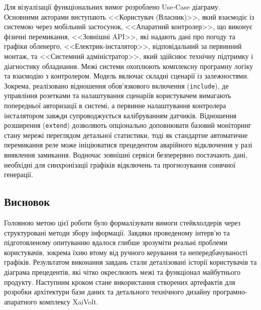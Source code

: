 \documentclass[14pt, a4paper]{extreport}
\begin{document}
	Для візуалізації функціональних вимог розроблено Use-Case діаграму. Основними акторами виступають <<Користувач (Власник)>>, який взаємодіє із системою через мобільний застосунок, <<Апаратний контролер>>, що виконує фізичні перемикання, <<Зовнішні API>>, які надають дані про погоду та графіки обленерго, <<Електрик-інсталятор>>, відповідальний за первинний монтаж, та <<Системний адміністратор>>, який здійснює технічну підтримку і діагностику обладнання. Межі системи охоплюють комплексну програмну логіку та взаємодію з контролером. Модель включає складні сценарії із залежностями. Зокрема, реалізовано відношення обов'язкового включення (\texttt{include}), де управління розетками та налаштування сценаріїв користувачем вимагають попередньої авторизації в системі, а первинне налаштування контролера інсталятором завжди супроводжується калібруванням датчиків. Відношення розширення (\texttt{extend}) дозволяють опціонально доповнювати базовий моніторинг стану мережі переглядом детальної статистики, тоді як стандартне автоматичне перемикання реле може ініціюватися прецедентом аварійного відключення у разі виявлення замикання. Водночас зовнішні сервіси безперервно постачають дані, необхідні для синхронізації графіків відключень та прогнозування сонячної генерації.
	
	
	\subsection*{Висновок}
	
	Головною метою цієї роботи було формалізувати вимоги стейкхолдерів через структуровані методи збору інформації. Завдяки проведеному інтерв'ю та підготовленому опитуванню вдалося глибше зрозуміти реальні проблеми користувачів, зокрема їхню втому від ручного керування та непередбачуваності графіків. Результатом виконання завдань стали деталізовані історії користувачів та діаграма прецедентів, які чітко окреслюють межі та функціонал майбутнього продукту. Наступним кроком стане використання створених артефактів для розробки архітектури бази даних та детального технічного дизайну програмно-апаратного комплексу XaiVolt.
	
\end{document}
